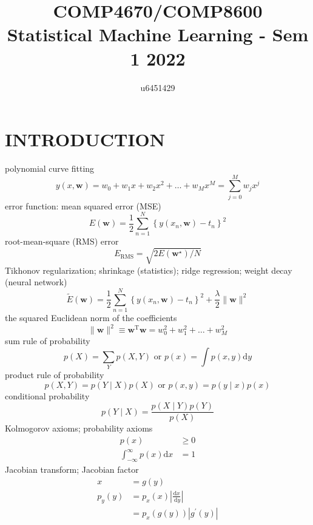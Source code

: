 \documentclass{article}
\title{COMP4670/COMP8600 \\ Statistical Machine Learning - Sem 1 2022}
\author{u6451429}
\begin{document}
	
	\maketitle
	
	\tableofcontents
	
	\pagebreak
	\section{INTRODUCTION}
	
	polynomial curve fitting
	$$
	y(x, \mathbf{w})=w_{0}+w_{1} x+w_{2} x^{2}+\ldots+w_{M} x^{M}=\sum_{j=0}^{M} w_{j} x^{j}
	$$
	error function: mean squared error (MSE)
	$$
	E(\mathbf{w})=\frac{1}{2} \sum_{n=1}^{N}\left\{y\left(x_{n}, \mathbf{w}\right)-t_{n}\right\}^{2}
	$$
	root-mean-square (RMS) error
	$$
	E_{\mathrm{RMS}}=\sqrt{2 E\left(\mathbf{w}^{\star}\right) / N}
	$$
	Tikhonov regularization; shrinkage (statistics); ridge regression; weight decay (neural network)
	$$
	\widetilde{E}(\mathbf{w})=\frac{1}{2} \sum_{n=1}^{N}\left\{y\left(x_{n}, \mathbf{w}\right)-t_{n}\right\}^{2}+\frac{\lambda}{2}\|\mathbf{w}\|^{2}
	$$
	the squared Euclidean norm of the coefficients
	$$
	\|\mathbf{w}\|^{2} \equiv \mathbf{w}^{\mathrm{T}} \mathbf{w}=w_{0}^{2}+w_{1}^{2}+\ldots+w_{M}^{2}
	$$
	sum rule of probability
	$$
	p(X)=\sum_{Y} p(X, Y)\text{ or } p(x)=\int p(x, y) \mathrm{d} y
	$$
	product rule of probability
	$$
	p(X, Y)=p(Y \mid X) p(X) \text{ or } p(x, y)=p(y \mid x) p(x)
	$$
	conditional probability
	$$
	p(Y \mid X)=\frac{p(X \mid Y) p(Y)}{p(X)}
	$$
	Kolmogorov axioms; probability axioms 
	$$
	\begin{aligned}
	p(x) & \geqslant 0 \\
	\int_{-\infty}^{\infty} p(x) \mathrm{d} x &=1
	\end{aligned}
	$$
	Jacobian transform; Jacobian factor
	$$
	\begin{aligned}
	x&=g(y)\\
	p_{y}(y) &=p_{x}(x)\left|\frac{\mathrm{d} x}{\mathrm{~d} y}\right| \\
	&=p_{x}(g(y))\left|g^{\prime}(y)\right| 
	\end{aligned}
	$$
	
\end{document}
